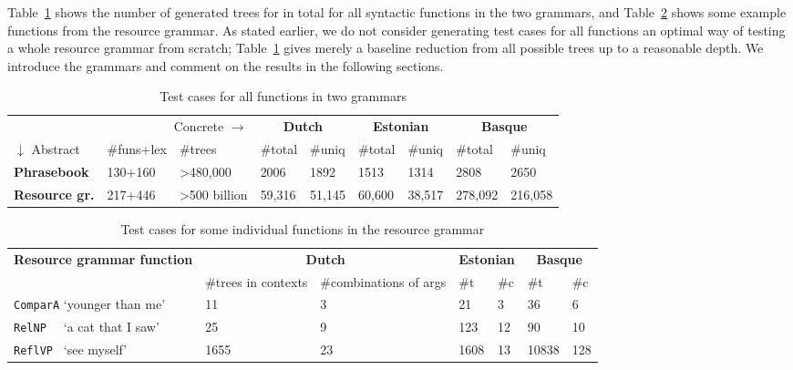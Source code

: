 \documentclass[11pt]{article}
\def\t#1{\texttt{#1}}
\begin{document}
Table~\ref{results} shows the number of generated trees for 
in total for all syntactic functions in the two grammars, and
Table~\ref{results_indiv} shows some example functions from the
resource grammar. 
As stated earlier, we do not consider generating test cases for all
functions an optimal way of testing a whole resource grammar from scratch;
Table~\ref{results} gives merely a baseline reduction from all
possible trees up to a reasonable depth. We introduce the grammars and
comment on the results in the following sections.

\begin{table}[h]
\centering
\begin{tabular}{|lll|ll|ll|ll|}
\hline
\multicolumn{3}{|r}{Concrete $\rightarrow$}              &
                                                                   \multicolumn{2}{|c}{\bf Dutch} & \multicolumn{2}{|c}{\bf Estonian} & \multicolumn{2}{|c|}{\bf Basque} \\
$\downarrow$ Abstract  & \#funs+lex & \#trees  &
                                                                 \#total & \#uniq & \#total & \#uniq  & \#total  & \#uniq \\ \hline
{\bf Phrasebook}       & 130+160         & \textgreater{}480,000       & 2006  & 1892    & 1513     & 1314   & 2808    & 2650   \\ \hline
{\bf Resource gr.} & 217+446         & \textgreater{}500 billion   & 59,316 & 51,145  & 60,600    & 38,517   & 278,092  & 216,058\\ \hline
\end{tabular}
\caption{Test cases for all functions in two grammars}
\label{results}
\end{table}

\begin{table}[h]
\centering
\begin{tabular}{|l|ll|ll|ll|}
\hline
{\bf Resource grammar function} &\multicolumn{2}{|c}{\bf Dutch}& \multicolumn{2}{|c}{\bf Estonian} & \multicolumn{2}{|c|}{\bf Basque}  \\
                               &  \#trees in contexts & \#combinations of args
                                                                                                  &\#t
                                                                                                    
                               & \#c & \#t &
                                                                    \#c\\ \hline
\t{ComparA} `younger than me'  &  11      & 3     & 21      & 3    & 36     & 6    \\
\t{RelNP~~} `a cat that I saw' &  25      & 9     & 123     & 12 & 90     & 10   \\
 \t{ReflVP~} `see myself'      &  1655    & 23    &1608     & 13   & 10838  &  128  \\

\hline
\end{tabular}
\caption{Test cases for some individual functions in the resource grammar}
\label{results_indiv}
\end{table}
\end{document}
